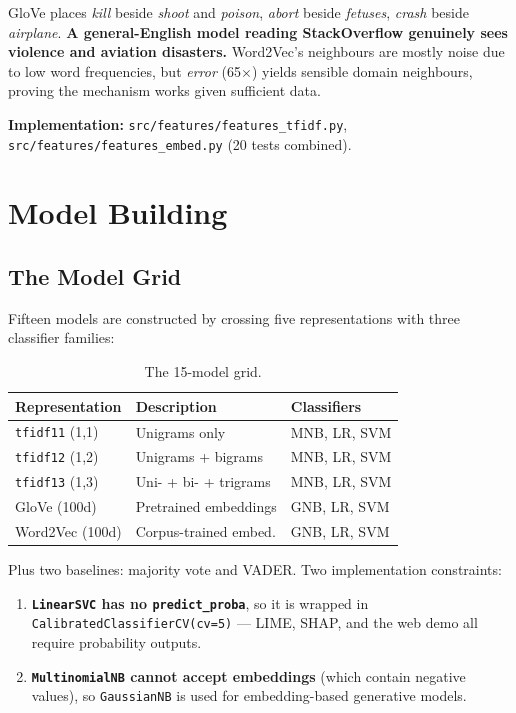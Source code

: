 \documentclass[11pt,a4paper]{article}
\begin{document}
GloVe places \textit{kill} beside \textit{shoot} and \textit{poison}, \textit{abort} beside \textit{fetuses}, \textit{crash} beside \textit{airplane}. \textbf{A general-English model reading StackOverflow genuinely sees violence and aviation disasters.} Word2Vec's neighbours are mostly noise due to low word frequencies, but \textit{error} (65$\times$) yields sensible domain neighbours, proving the mechanism works given sufficient data.

\textbf{Implementation:} \texttt{src/features/features\_tfidf.py}, \texttt{src/features/features\_embed.py} (20 tests combined).

\section{Model Building}
\label{sec:modeling}

\subsection{The Model Grid}

Fifteen models are constructed by crossing five representations with three classifier families:

\begin{table}[H]
\centering
\caption{The 15-model grid.}
\label{tab:modelgrid}
\begin{tabular}{lll}
\toprule
\textbf{Representation} & \textbf{Description} & \textbf{Classifiers} \\
\midrule
\texttt{tfidf11} (1,1) & Unigrams only            & MNB, LR, SVM \\
\texttt{tfidf12} (1,2) & Unigrams + bigrams       & MNB, LR, SVM \\
\texttt{tfidf13} (1,3) & Uni- + bi- + trigrams    & MNB, LR, SVM \\
GloVe (100d)            & Pretrained embeddings    & GNB, LR, SVM \\
Word2Vec (100d)         & Corpus-trained embed.    & GNB, LR, SVM \\
\bottomrule
\end{tabular}
\end{table}

Plus two baselines: majority vote and VADER. Two implementation constraints:

\begin{enumerate}[leftmargin=*]
    \item \textbf{\texttt{LinearSVC} has no \texttt{predict\_proba}}, so it is wrapped in \texttt{CalibratedClassifierCV(cv=5)} --- LIME, SHAP, and the web demo all require probability outputs.
    \item \textbf{\texttt{MultinomialNB} cannot accept embeddings} (which contain negative values), so \texttt{GaussianNB} is used for embedding-based generative models.
\end{enumerate}
\end{document}
